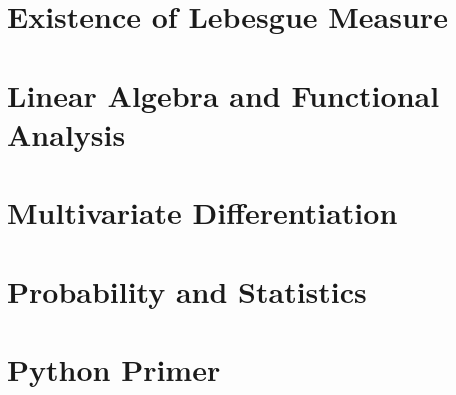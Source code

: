 \documentclass[12pt, a4paper]{article}
\begin{document}
\section{Existence of Lebesgue Measure}


\section{Linear Algebra and Functional Analysis}


\section{Multivariate Differentiation}


\section{Probability and Statistics}
%

\section{Python Primer}
%
\end{document}
